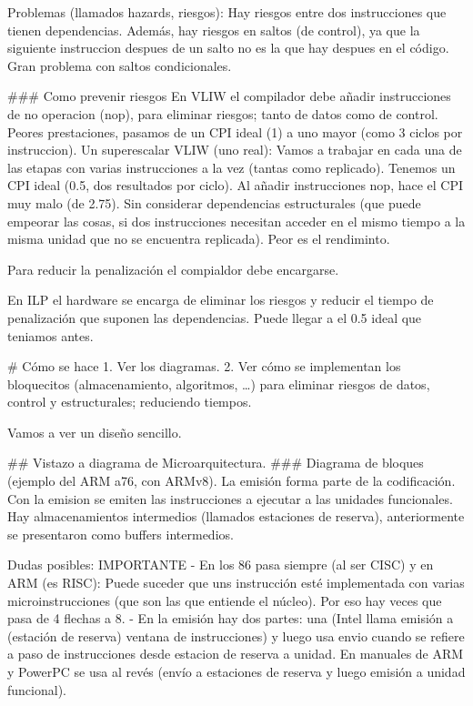 Problemas (llamados hazards, riesgos): Hay riesgos entre dos instrucciones que tienen dependencias. Además, hay riesgos en saltos (de control), ya que la siguiente instruccion despues de un salto no es la que hay despues en el código. Gran problema con saltos condicionales.

### Como prevenir riesgos 
En VLIW el compilador debe añadir instrucciones de no operacion (nop), para eliminar riesgos; tanto de datos como de control. Peores prestaciones, pasamos de un CPI ideal (1) a uno mayor (como 3 ciclos por instruccion).
Un superescalar VLIW (uno real): Vamos a trabajar en cada una de las etapas con varias instrucciones a la vez (tantas como replicado). Tenemos un CPI ideal (0.5, dos resultados por ciclo). Al añadir instrucciones nop, hace el CPI muy malo (de 2.75). Sin considerar dependencias estructurales (que puede empeorar las cosas, si dos instrucciones necesitan acceder en el mismo tiempo a la misma unidad que no se encuentra replicada). Peor es el rendiminto.

Para reducir la penalización el compialdor debe encargarse.

En ILP el hardware se encarga de eliminar los riesgos y reducir el tiempo de penalización que suponen las dependencias. Puede llegar a el 0.5 ideal que teniamos antes.

# Cómo se hace
1. Ver los diagramas.
2. Ver cómo se implementan los bloquecitos (almacenamiento, algoritmos, \ldots) para eliminar riesgos de datos, control y estructurales; reduciendo tiempos.

Vamos a ver un diseño sencillo.

## Vistazo a diagrama de Microarquitectura.
### Diagrama de bloques (ejemplo del ARM a76, con ARMv8).
La emisión forma parte de la codificación. Con la emision se emiten las instrucciones a ejecutar a las unidades funcionales. 
Hay almacenamientos intermedios (llamados estaciones de reserva), anteriormente se presentaron como buffers intermedios.

Dudas posibles: IMPORTANTE
- En los 86 pasa siempre (al ser CISC) y en ARM (es RISC): Puede suceder que uns instrucción esté implementada con varias microinstrucciones (que son las que entiende el núcleo). Por eso hay veces que pasa de 4 flechas a 8.
- En la emisión hay dos partes: una (Intel llama emisión a (estación de reserva) ventana de instrucciones) y luego usa envio cuando se refiere a paso de instrucciones desde estacion de reserva a unidad. En manuales de ARM y PowerPC se usa al revés (envío a estaciones de reserva y luego emisión a unidad funcional).


